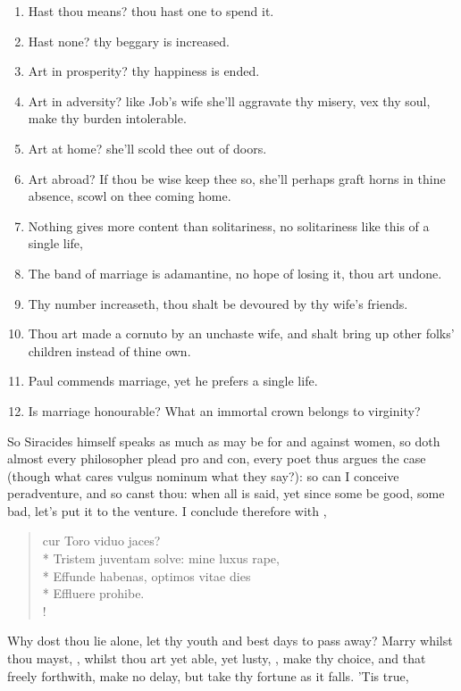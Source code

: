 \begin{enumerate}
  \item Hast thou means? thou hast one to spend it.
  \item Hast none? thy beggary is increased.
  \item Art in prosperity? thy happiness is ended.
  \item Art in adversity? like Job's wife she'll aggravate thy misery, vex thy soul, make thy burden intolerable.
  \item Art at home? she'll scold thee out of doors.
  \item Art abroad? If thou be wise keep thee so, she'll perhaps graft horns in thine absence, scowl on thee coming home.
  \item Nothing gives more content than solitariness, no solitariness like this of a single life,
  \item The band of marriage is adamantine, no hope of losing it, thou art undone.
  \item Thy number increaseth, thou shalt be devoured by thy wife's friends.
  \item Thou art made a cornuto by an unchaste wife, and shalt bring up other folks' children instead of thine own.
  \item Paul commends marriage, yet he prefers a single life.
  \item Is marriage honourable? What an immortal crown belongs to virginity?
\end{enumerate}

So Siracides himself speaks as much as may be for and against women, so
doth almost every philosopher plead pro and con, every poet thus argues
the case (though what cares vulgus nominum what they say?): so can I
conceive peradventure, and so canst thou: when all is said, yet since
some be good, some bad, let's put it to the venture. I conclude
therefore with \Seneca{}{},

\begin{latin}
\begin{verse}%
cur Toro viduo jaces?\\*
Tristem juventam solve: mine luxus rape,\\*
Effunde habenas, optimos vitae dies\\*
Effluere prohibe.\\!
\end{verse}%
\end{latin}

Why dost thou lie alone, let thy youth and best days to pass away?
Marry whilst thou mayst, , whilst
thou art yet able, yet lusty, , make thy choice, and that freely forthwith, make no delay, but
take thy fortune as it falls. 'Tis true,

